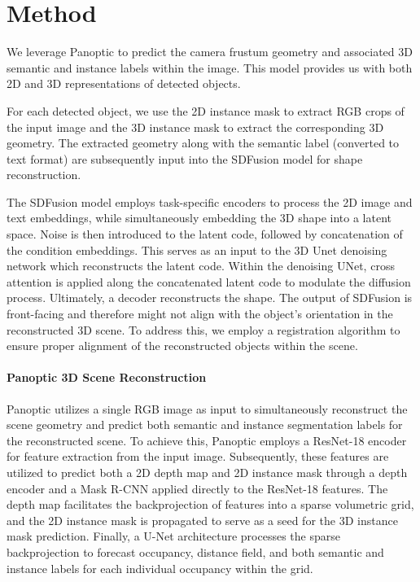 \section{Method}
\label{sec:method}

We leverage Panoptic \cite{dahnert2021panoptic} to predict the camera frustum geometry and associated 3D semantic and instance labels within the image. This model provides us with both 2D and 3D representations of detected objects.

For each detected object, we use the 2D instance mask to extract RGB crops of the input image and the 3D instance mask to extract the corresponding 3D geometry.
The extracted geometry along with the semantic label (converted to text format) are subsequently input into the SDFusion model for shape reconstruction.

The SDFusion model employs task-specific encoders to process the 2D image and text embeddings, while simultaneously embedding the 3D shape into a latent space. Noise is then introduced to the latent code, followed by concatenation of the condition embeddings. This serves as an input to the 3D Unet denoising network which reconstructs the latent code. Within the denoising UNet, cross attention is applied along the concatenated latent code to modulate the diffusion process. Ultimately, a decoder reconstructs the shape. The output of SDFusion is front-facing and therefore might not align with the object's orientation in the reconstructed 3D scene. To address this, we employ a registration algorithm to ensure proper alignment of the reconstructed objects within the scene.

\paragraph{ Panoptic 3D Scene Reconstruction}
Panoptic \cite{dahnert2021panoptic} utilizes a single RGB image as input to simultaneously reconstruct the scene geometry and predict both semantic and instance segmentation labels for the reconstructed scene. To achieve this, Panoptic employs a ResNet-18 encoder for feature extraction from the input image. Subsequently, these features are utilized to predict both a 2D depth map and 2D instance mask through a depth encoder and a Mask R-CNN applied directly to the ResNet-18 features. The depth map facilitates the backprojection of features into a sparse volumetric grid, and the 2D instance mask is propagated to serve as a seed for the 3D instance mask prediction. Finally, a U-Net architecture processes the sparse backprojection to forecast occupancy, distance field, and both semantic and instance labels for each individual occupancy within the grid.

